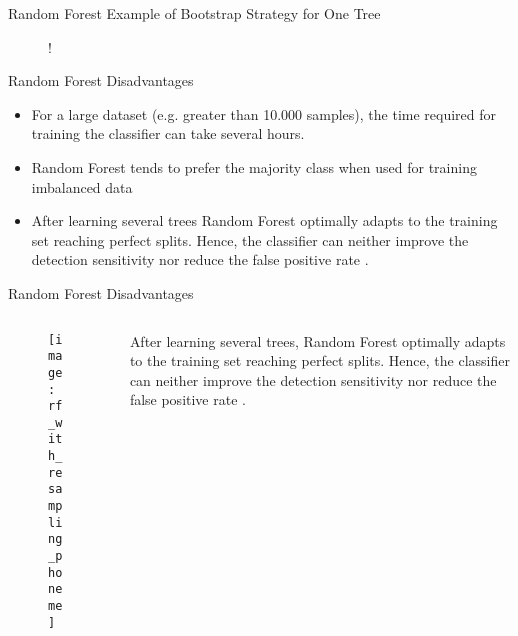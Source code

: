 \documentclass{beamer}
\begin{document}
\begin{frame}
	{Random Forest}
	{Example of Bootstrap Strategy for One Tree}
	\begin{figure}
		\centering
		\resizebox {5cm} {!} {
		}
	\end{figure}
\end{frame}

\begin{frame}
	{Random Forest}
	{Disadvantages}
	\begin{itemize}
		\item For a large dataset (e.g. greater than 10.000 samples), the time
		required for training the classifier can take several hours.
		\item Random Forest tends to prefer the majority class when used for
		training imbalanced data \cite{strobl2007bias}
		\item After learning several trees Random Forest optimally adapts to
		the training set reaching perfect splits. Hence, the classifier can
		neither improve the detection sensitivity nor reduce the false positive
		rate \cite{baumann2013cascaded}.
	\end{itemize}
\end{frame}

\begin{frame}
	{Random Forest}
	{Disadvantages}
	\begin{columns}
		\begin{column}{0.5\textwidth}
			\begin{figure}
				\centering
				\texttt{[image: rf\_with\_resampling\_phoneme]}
			\end{figure}
		\end{column}
		\begin{column}{0.5\textwidth}
			After learning several trees, Random Forest optimally adapts to the
			training set reaching perfect splits.
			Hence, the classifier can neither improve the detection sensitivity
			nor reduce the false positive rate \cite{baumann2013cascaded}.
		\end{column}
	\end{columns}
\end{frame}
\end{document}
